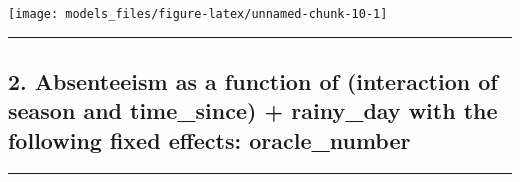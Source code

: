 \documentclass[]{article}
\begin{document}
\begin{center}\texttt{[image: models\_files/figure-latex/unnamed-chunk-10-1]} \end{center}

\newpage

\begin{center}\rule{0.5\linewidth}{\linethickness}\end{center}

\subsection{2. Absenteeism as a function of (interaction of season and
time\_since) + rainy\_day with the following fixed effects:
oracle\_number}\label{absenteeism-as-a-function-of-interaction-of-season-and-time_since-rainy_day-with-the-following-fixed-effects-oracle_number}

\begin{center}\rule{0.5\linewidth}{\linethickness}\end{center}
\end{document}
